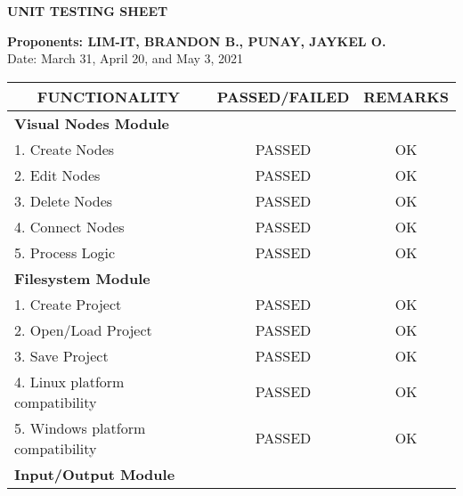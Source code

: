 \clearpage
{}
\textbf{UNIT TESTING SHEET}
\leavevmode\\
\begin{flushleft}
	\textbf{Proponents: LIM-IT, BRANDON B., PUNAY, JAYKEL O.}
	\leavevmode\\
	Date: March 31, April 20, and May 3, 2021
\end{flushleft}

\begin{longtable}[c]{|l|c|c|}
\hline
\multicolumn{1}{|c|}{\textbf{FUNCTIONALITY}} & \textbf{PASSED/FAILED} & \textbf{REMARKS} \\ \hline
\endfirsthead
%
\endhead
%
\multicolumn{3}{|l|}{\textbf{Visual Nodes Module}}                                       \\ \hline
1. Create Nodes                              & PASSED                 & OK               \\ \hline
2. Edit Nodes                                & PASSED                 & OK               \\ \hline
3. Delete Nodes                              & PASSED                 & OK               \\ \hline
4. Connect Nodes                             & PASSED                 & OK               \\ \hline
5. Process Logic                             & PASSED                 & OK               \\ \hline
\multicolumn{3}{|l|}{\textbf{Filesystem Module}}                                         \\ \hline
1. Create Project                            & PASSED                 & OK               \\ \hline
2. Open/Load Project                         & PASSED                 & OK               \\ \hline
3. Save Project                              & PASSED                 & OK               \\ \hline
4. Linux platform compatibility              & PASSED                 & OK               \\ \hline
5. Windows platform compatibility            & PASSED                 & OK               \\ \hline
\multicolumn{3}{|l|}{\textbf{Input/Output Module}}                                       \\ \hline

\end{longtable}
